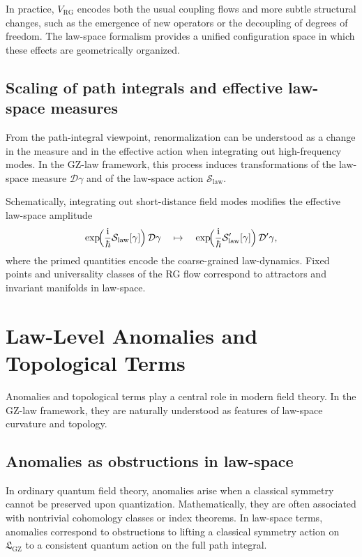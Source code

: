 \documentclass[11pt]{book}
\newcommand{\GZLS}{\ensuremath{\mathfrak{L}_{\mathrm{GZ}}}}
\theoremstyle{plain}
\theoremstyle{definition}
\theoremstyle{remark}
\begin{document}
In practice, $V_{\mathrm{RG}}$ encodes both the usual coupling flows
and more subtle structural changes, such as the emergence of new
operators or the decoupling of degrees of freedom. The law-space
formalism provides a unified configuration space in which these effects
are geometrically organized.

\subsection{Scaling of path integrals and effective law-space measures}

From the path-integral viewpoint, renormalization can be understood as
a change in the measure and in the effective action when integrating
out high-frequency modes. In the GZ-law framework, this process induces
transformations of the law-space measure $\mathcal{D}\gamma$ and of the
law-space action $\mathcal{S}_{\mathrm{law}}$.

Schematically, integrating out short-distance field modes modifies the
effective law-space amplitude
\[
   \exp\!\Bigl(\frac{\mathrm{i}}{\hbar}
   \mathcal{S}_{\mathrm{law}}[\gamma]\Bigr)
   \,\mathcal{D}\gamma
\quad\mapsto\quad
   \exp\!\Bigl(\frac{\mathrm{i}}{\hbar}
   \mathcal{S}'_{\mathrm{law}}[\gamma]\Bigr)
   \,\mathcal{D}'\gamma,
\]
where the primed quantities encode the coarse-grained law-dynamics.
Fixed points and universality classes of the RG flow correspond to
attractors and invariant manifolds in law-space.

\section{Law-Level Anomalies and Topological Terms}
\label{sec:law-anomalies-topological}



Anomalies and topological terms play a central role in modern field
theory. In the GZ-law framework, they are naturally understood as
features of law-space curvature and topology.

\subsection{Anomalies as obstructions in law-space}

In ordinary quantum field theory, anomalies arise when a classical
symmetry cannot be preserved upon quantization. Mathematically, they
are often associated with nontrivial cohomology classes or index
theorems. In law-space terms, anomalies correspond to obstructions to
lifting a classical symmetry action on $\GZLS$ to a consistent quantum
action on the full path integral.
\end{document}
